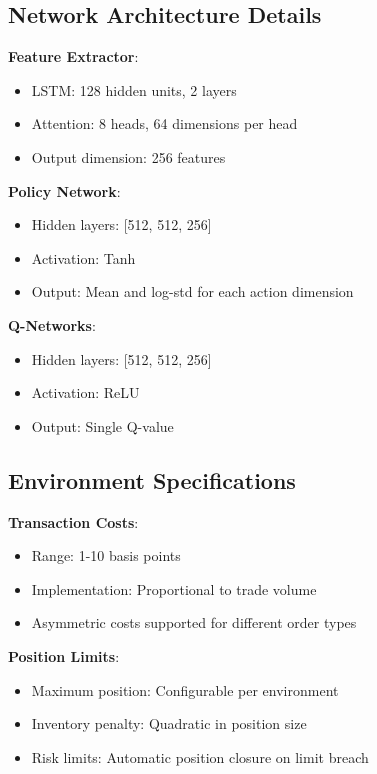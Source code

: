 \documentclass[11pt,a4paper]{article}
\begin{document}
\subsection{Network Architecture Details}

\textbf{Feature Extractor}:
\begin{itemize}
\item LSTM: 128 hidden units, 2 layers
\item Attention: 8 heads, 64 dimensions per head
\item Output dimension: 256 features
\end{itemize}

\textbf{Policy Network}:
\begin{itemize}
\item Hidden layers: [512, 512, 256]
\item Activation: Tanh
\item Output: Mean and log-std for each action dimension
\end{itemize}

\textbf{Q-Networks}:
\begin{itemize}
\item Hidden layers: [512, 512, 256]
\item Activation: ReLU
\item Output: Single Q-value
\end{itemize}

\subsection{Environment Specifications}

\textbf{Transaction Costs}:
\begin{itemize}
\item Range: 1-10 basis points
\item Implementation: Proportional to trade volume
\item Asymmetric costs supported for different order types
\end{itemize}

\textbf{Position Limits}:
\begin{itemize}
\item Maximum position: Configurable per environment
\item Inventory penalty: Quadratic in position size
\item Risk limits: Automatic position closure on limit breach
\end{itemize}
\end{document}
